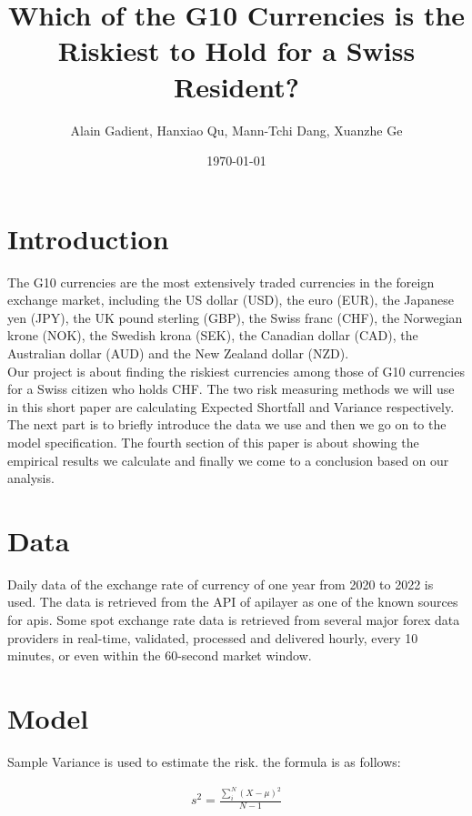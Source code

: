 \documentclass{article}
\begin{document}
\title{Which of the G10 Currencies is the Riskiest to Hold for a Swiss Resident?}
\author{Alain Gadient, Hanxiao Qu, Mann-Tchi Dang, Xuanzhe Ge}
\date{\today}
\maketitle

\section{Introduction}

The G10 currencies are the most extensively traded currencies in the foreign exchange market, including the US dollar (USD), the euro (EUR), the Japanese yen (JPY), the UK pound sterling (GBP), the Swiss franc (CHF), the Norwegian krone (NOK), the Swedish krona (SEK), the Canadian dollar (CAD), the Australian dollar (AUD) and the New Zealand dollar (NZD). \\

Our project is about finding the riskiest currencies among those of G10 currencies for a Swiss citizen who holds CHF. The two risk measuring methods we will use in this short paper are calculating Expected Shortfall and Variance respectively. The next part is to briefly introduce the data we use and then we go on to the model specification. The fourth section of this paper is about showing the empirical results we calculate and finally we come to a conclusion based on our analysis.   

\section{Data}

Daily data of the exchange rate of currency of one year from 2020 to 2022 is used. The data is retrieved  from the API of apilayer as one of the known sources for apis. Some spot exchange rate data is retrieved from several major forex data providers in real-time, validated, processed and delivered hourly, every 10 minutes, or even within the 60-second market window.

\section{Model}

Sample Variance is used to estimate the risk. the formula is as follows:

\begin{align}
	s^2 =  \frac{\sum_{i}^{N}{(X-\mu)^2}}{N-1} 
\end{align}
\end{document}
